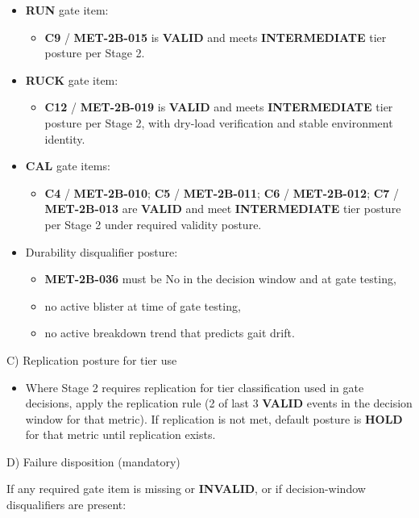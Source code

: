 \documentclass[10pt]{article}
\begin{document}
\begin{itemize}
\item \textbf{RUN} gate item:
  \begin{itemize}
  \item \textbf{C9} / \textbf{MET-2B-015} is \textbf{VALID} and meets \textbf{INTERMEDIATE} tier posture per Stage 2.
  \end{itemize}
\item \textbf{RUCK} gate item:
  \begin{itemize}
  \item \textbf{C12} / \textbf{MET-2B-019} is \textbf{VALID} and meets \textbf{INTERMEDIATE} tier posture per Stage 2, with dry-load verification and stable environment identity.
  \end{itemize}
\item \textbf{CAL} gate items:
  \begin{itemize}
  \item \textbf{C4} / \textbf{MET-2B-010}; \textbf{C5} / \textbf{MET-2B-011}; \textbf{C6} / \textbf{MET-2B-012}; \textbf{C7} / \textbf{MET-2B-013} are \textbf{VALID} and meet \textbf{INTERMEDIATE} tier posture per Stage 2 under required validity posture.
  \end{itemize}
\item Durability disqualifier posture:
  \begin{itemize}
  \item \textbf{MET-2B-036} must be No in the decision window and at gate testing,
  \item no active blister at time of gate testing,
  \item no active breakdown trend that predicts gait drift.
  \end{itemize}
\end{itemize}

C) Replication posture for tier use

\begin{itemize}
\item Where Stage 2 requires replication for tier classification used in gate decisions, apply the replication rule (2 of last 3 \textbf{VALID} events in the decision window for that metric). If replication is not met, default posture is \textbf{HOLD} for that metric until replication exists.
\end{itemize}

D) Failure disposition (mandatory)

If any required gate item is missing or \textbf{INVALID}, or if decision-window disqualifiers are present:
\end{document}
